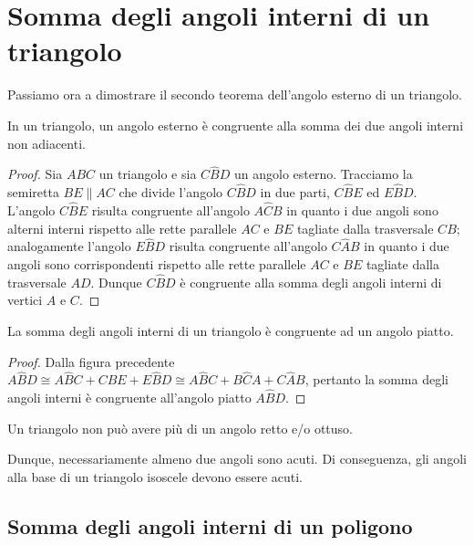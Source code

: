 \section{Somma degli angoli interni di un triangolo}

Passiamo ora a dimostrare il secondo teorema dell'angolo esterno di un triangolo.
\begin{teorema}
In un triangolo, un angolo esterno è congruente alla somma dei due angoli interni non adiacenti.
\end{teorema}

\begin{figure}[htb]
\centering
\end{figure}

\begin{proof}
Sia $ABC$ un triangolo e sia $C\widehat{B}D$ un angolo esterno. Tracciamo la semiretta $BE\parallel AC$ che divide l'angolo $C\widehat{B}D$ in due parti, $C\widehat{B}E$ ed $E\widehat{B}D$. L'angolo $C\widehat{B}E$ risulta congruente all'angolo $A\widehat{C}B$ in quanto i due angoli sono alterni interni rispetto alle rette parallele $AC$ e $BE$ tagliate dalla trasversale $CB$; analogamente l'angolo $E\widehat{B}D$ risulta congruente all'angolo $C\widehat{A}B$ in quanto i due angoli sono corrispondenti rispetto alle rette parallele $AC$ e $BE$ tagliate dalla trasversale $AD$. Dunque $C\widehat{B}D$ è congruente alla somma degli angoli interni di vertici $A$ e $C$.
\end{proof}

\begin{corollario}
La somma degli angoli interni di un triangolo è congruente ad un angolo piatto.
\end{corollario}
\begin{proof}
Dalla figura precedente $A\widehat{B}D\cong A\widehat{B}C + C\widehat{B}E + E\widehat{B}D\cong A\widehat{B}C + B\widehat{C}A + C\widehat{A}B$, pertanto la somma degli angoli interni è congruente all'angolo piatto $A\widehat{B}D$.
\end{proof}
\begin{corollario}
Un triangolo non può avere più di un angolo retto e/o ottuso.
\end{corollario}
Dunque, necessariamente almeno due angoli sono acuti. Di conseguenza, gli angoli alla base di un triangolo isoscele devono essere acuti.

\subsection{Somma degli angoli interni di un poligono}

